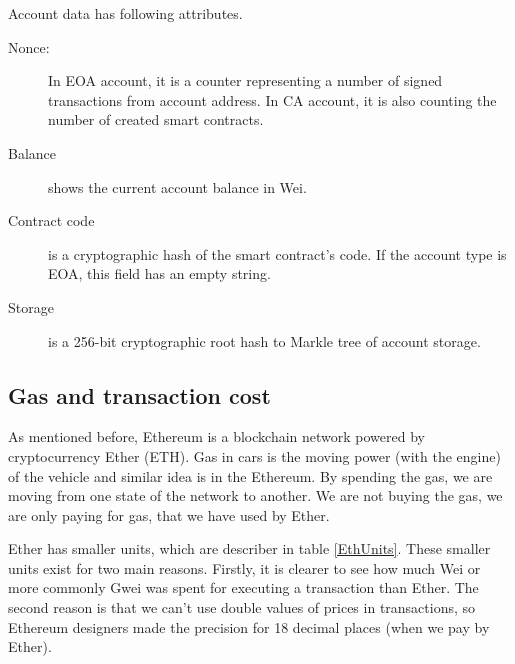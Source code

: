 \documentclass[thesis=M,english]{FITthesis}[2019/12/23]
\begin{document}
Account data has following attributes.
\begin{description}
\item [Nonce:] 
In EOA account, it is a counter representing a number of signed transactions from account address. 
In CA account, it is also counting the number of created smart contracts.
\item [Balance] shows the current account balance in Wei.
\item [Contract code] is a cryptographic hash of the smart contract's code. If the account type is EOA, this field has an empty string. 
\item [Storage] is a 256-bit cryptographic root hash to Markle tree of account storage. 

\end{description}








\subsection{Gas and transaction cost}
As mentioned before, Ethereum is a blockchain network powered by cryptocurrency Ether (ETH). Gas in cars is the moving power (with the engine) of the vehicle and similar idea is in the Ethereum. By spending the gas, we are moving from one state of the network to another. We are not buying the gas, we are only paying for gas, that we have used by Ether. 

Ether has smaller units, which are describer in table \ref{EthUnits}. These smaller units exist for two main reasons. Firstly, it is clearer to see how much Wei or more commonly Gwei was spent for executing a transaction than Ether. The second reason is that we can't use double values of prices in transactions, so Ethereum designers made the precision for 18 decimal places (when we pay by Ether). 
\end{document}
